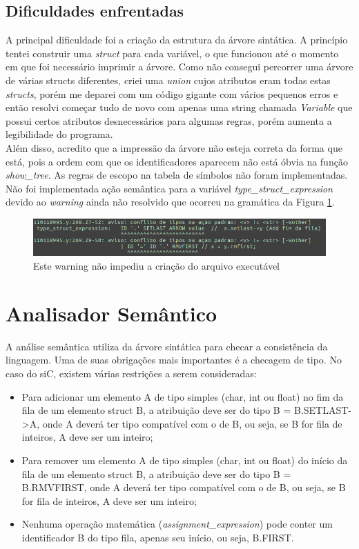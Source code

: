 \documentclass[12pt]{article}
\begin{document}
\subsection{Dificuldades enfrentadas}

\indent A principal dificuldade foi a criação da estrutura da árvore sintática. A princípio tentei construir uma \textit{struct} para cada variável, o que funcionou até o momento em que  foi necessário imprimir a árvore. Como não consegui percorrer uma árvore de várias structs diferentes, criei uma \textit{union} cujos atributos eram todas estas \textit{structs}, porém me deparei com um código gigante com vários pequenos erros e então resolvi começar tudo de novo com apenas uma string chamada \textit{Variable} que possui certos atributos desnecessários para algumas regras, porém aumenta a legibilidade do programa. \\
\indent Além disso, acredito que a impressão da árvore não esteja correta da forma que está, pois a ordem com que os identificadores aparecem não está óbvia na função \textit{show\_tree}. As regras de escopo na tabela de símbolos não foram implementadas.
\indent Não foi implementada ação semântica para a variável \textit{type\_struct\_expression} devido ao \textit{warning} ainda não resolvido que ocorreu na gramática da Figura \ref{avisoBison}.

\begin{figure}[!ht]
  \centering
  \includegraphics[width=1\textwidth]{avisoBison.png}
  \caption{Este warning não impediu a criação do arquivo executável} \label{avisoBison}
\end{figure}


\section{Analisador Semântico} \label{AnalSem}

\indent A análise semântica utiliza da árvore sintática para checar a consistência da linguagem. Uma de suas obrigações mais importantes é a checagem de tipo. No caso do siC, existem várias restrições a serem consideradas:
\begin{itemize}
    \item Para adicionar um elemento A de tipo simples (char, int ou float) no fim da fila de um elemento struct B, a atribuição deve ser do tipo B = B.SETLAST->A, onde A deverá ter tipo compatível com o de B, ou seja, se B for fila de inteiros, A deve ser um inteiro;
    \item Para remover um elemento A de tipo simples (char, int ou float) do início da fila de um elemento struct B, a atribuição deve ser do tipo B = B.RMVFIRST, onde A deverá ter tipo compatível com o de B, ou seja, se B for fila de inteiros, A deve ser um inteiro;
    \item Nenhuma operação matemática (\textit{assignment\_expression}) pode conter um identificador B do tipo fila, apenas seu início, ou seja, B.FIRST.
\end{itemize}
\end{document}
